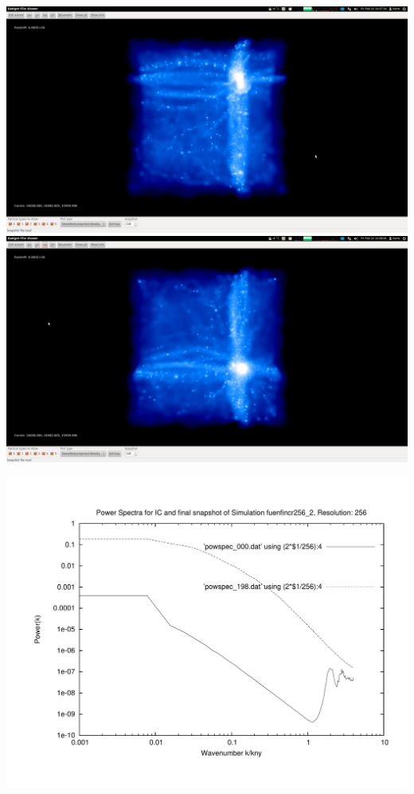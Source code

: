 \includegraphics[scale=0.12]{r256/fuenfincr256_2/1.png} 
\includegraphics[scale=0.12]{r256/fuenfincr256_2/2.png}

\includegraphics[scale=0.5]{r256/fuenfincr256_2/plot_powspec_fuenfincr256_2}


